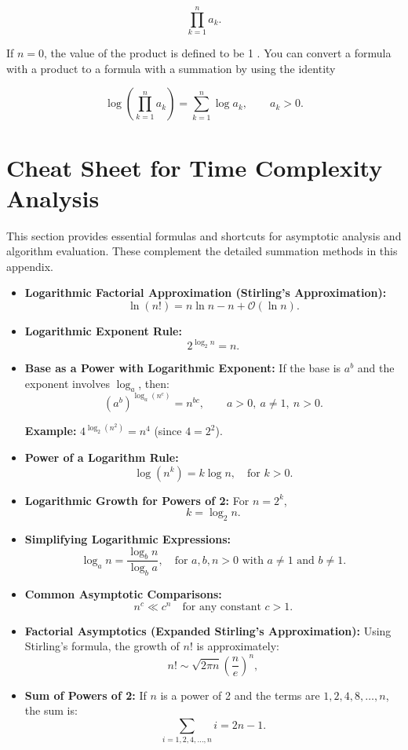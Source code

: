 \[
\prod_{k=1}^n a_k .
\]


If $n=0$, the value of the product is defined to be 1 . You can convert a formula with a product to a formula with a summation by using the identity

\[
\log \left(\prod_{k=1}^n a_k\right)=\sum_{k=1}^n \log a_k, \qquad a_k>0.
\]

\section*{Cheat Sheet for Time Complexity Analysis}

This section provides essential formulas and shortcuts for asymptotic analysis and algorithm evaluation. These complement the detailed summation methods in this appendix.

\begin{itemize}
    \item \textbf{Logarithmic Factorial Approximation (Stirling's Approximation):} 
    \[
    \ln(n!) = n\ln n-n+\mathcal{O}(\ln n).
    \]
 
    \item \textbf{Logarithmic Exponent Rule:} 
    \[
    2^{\log_2 n} = n.
    \]

    \item \textbf{Base as a Power with Logarithmic Exponent:} 
    If the base is \( a^b \) and the exponent involves \( \log_a \), then:
    \[
    (a^b)^{\log_a(n^c)} = n^{bc}, \qquad a>0,\ a\neq1,\ n>0.
    \]
    
    \textbf{Example:} \( 4^{\log_2(n^2)} = n^4 \) (since \( 4 = 2^2 \)).
    
    \item \textbf{Power of a Logarithm Rule:} 
    \[
    \log(n^k) = k \log n, \quad \text{for } k > 0.
    \]
    
    \item \textbf{Logarithmic Growth for Powers of 2:} 
    For \( n = 2^k \),
    \[
    k = \log_2 n.
    \]
    
    \item \textbf{Simplifying Logarithmic Expressions:} 
    \[
    \log_a n = \frac{\log_b n}{\log_b a}, \quad \text{for } a,b,n>0 \text{ with } a\neq1 \text{ and } b\neq1.
    \]
    
    \item \textbf{Common Asymptotic Comparisons:} 
    \[
    n^c \ll c^n \quad \text{for any constant } c > 1.
    \]
    
    \item \textbf{Factorial Asymptotics (Expanded Stirling's Approximation):} 
    Using Stirling's formula, the growth of \( n! \) is approximately:
    \[
    n! \sim \sqrt{2\pi n}\left(\frac{n}{e}\right)^n,
    \]
    
    \item \textbf{Sum of Powers of 2:} 
    If $n$ is a power of 2 and the terms are \(1,2,4,8,\ldots,n\), the sum is:
    \[
    \sum_{i=1,2,4,\ldots,n} i = 2n - 1.
    \]

\end{itemize}
